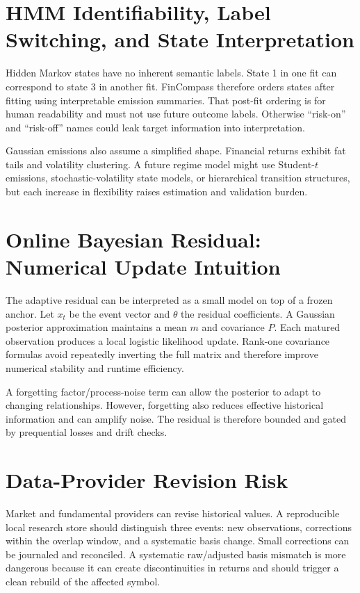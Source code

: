 \documentclass[11pt]{article}
\begin{document}
\section{HMM Identifiability, Label Switching, and State Interpretation}
Hidden Markov states have no inherent semantic labels. State 1 in one fit can correspond to state 3 in another fit. FinCompass therefore orders states after fitting using interpretable emission summaries. That post-fit ordering is for human readability and must not use future outcome labels. Otherwise ``risk-on'' and ``risk-off'' names could leak target information into interpretation.

Gaussian emissions also assume a simplified shape. Financial returns exhibit fat tails and volatility clustering. A future regime model might use Student-$t$ emissions, stochastic-volatility state models, or hierarchical transition structures, but each increase in flexibility raises estimation and validation burden.

\section{Online Bayesian Residual: Numerical Update Intuition}
The adaptive residual can be interpreted as a small model on top of a frozen anchor. Let $x_t$ be the event vector and $\theta$ the residual coefficients. A Gaussian posterior approximation maintains a mean $m$ and covariance $P$. Each matured observation produces a local logistic likelihood update. Rank-one covariance formulas avoid repeatedly inverting the full matrix and therefore improve numerical stability and runtime efficiency.

A forgetting factor/process-noise term can allow the posterior to adapt to changing relationships. However, forgetting also reduces effective historical information and can amplify noise. The residual is therefore bounded and gated by prequential losses and drift checks.

\section{Data-Provider Revision Risk}
Market and fundamental providers can revise historical values. A reproducible local research store should distinguish three events: new observations, corrections within the overlap window, and a systematic basis change. Small corrections can be journaled and reconciled. A systematic raw/adjusted basis mismatch is more dangerous because it can create discontinuities in returns and should trigger a clean rebuild of the affected symbol.
\end{document}

